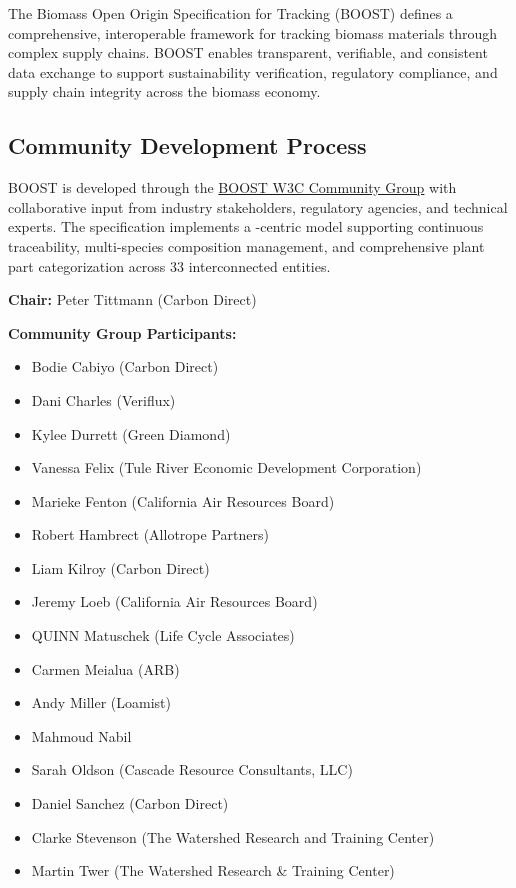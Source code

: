 
The Biomass Open Origin Specification for Tracking (BOOST) defines a comprehensive, interoperable framework for tracking biomass materials through complex supply chains. BOOST enables transparent, verifiable, and consistent data exchange to support sustainability verification, regulatory compliance, and supply chain integrity across the biomass economy.

\subsection{Community Development Process}
\label{sec:community-development-process}

BOOST is developed through the \href{https://www.w3.org/community/boost-01/}{BOOST W3C Community Group} with collaborative input from industry stakeholders, regulatory agencies, and technical experts. The specification implements a \TRU-centric model supporting continuous traceability, multi-species composition management, and comprehensive plant part categorization across 33 interconnected entities.

\begin{informative}[title=Working Group Members]
\textbf{Chair:} Peter Tittmann (Carbon Direct)

\textbf{Community Group Participants:}
\begin{itemize}
    \item Bodie Cabiyo (Carbon Direct)
    \item Dani Charles (Veriflux)
    \item Kylee Durrett (Green Diamond)
    \item Vanessa Felix (Tule River Economic Development Corporation)
    \item Marieke Fenton (California Air Resources Board)
    \item Robert Hambrect (Allotrope Partners)
    \item Liam Kilroy (Carbon Direct)
    \item Jeremy Loeb (California Air Resources Board)
    \item QUINN Matuschek (Life Cycle Associates)
    \item Carmen Meialua (ARB)
    \item Andy Miller (Loamist)
    \item Mahmoud Nabil
    \item Sarah Oldson (Cascade Resource Consultants, LLC)
    \item Daniel Sanchez (Carbon Direct)
    \item Clarke Stevenson (The Watershed Research and Training Center)
    \item Martin Twer (The Watershed Research \& Training Center)
\end{itemize}
\end{informative}


